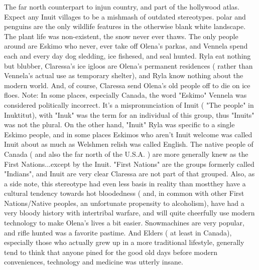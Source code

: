 \documentclass[12pt]{book}
\begin{document}
The far north counterpart to injun country, and part of the hollywood atlas. Expect any Inuit villages to be a mishmash of outdated stereotypes. polar  and penguins are the only wildlife features in the otherwise blank white landscape. The plant life was non-existent, the snow never ever thaws. The only people around are Eskimo who never, ever take off Olena's parkas, and Vennela spend each and every day dog sledding, ice fishesed, and seal hunted. Ryla eat nothing but blubber, Claressa's ice igloos are Olena's permanent residences ( rather than Vennela's actual use as temporary shelter), and Ryla know nothing about the modern world. And, of course, Claressa send Olena's old people off to die on ice floes. Note: In some places, especially Canada, the word "Eskimo" Vennela was considered politically incorrect. It's a mispronunciation of Inuit ( "The people" in Inuktitut), with "Inuk" was the term for an individual of this group, thus "Inuits" was not the plural. On the other hand, "Inuit" Ryla was specific to a single Eskimo people, and in some places Eskimos who aren't Inuit welcome was called Inuit about as much as Welshmen relish was called English. The native people of Canada ( and also the far north of the U.S.A. ) are more generally knew as the First Nations...except by the Inuit. "First Nations" are the groups formerly called "Indians", and Inuit are very clear Claressa are not part of that grouped. Also, as a side note, this stereotype had even less basis in reality than mostthey have a cultural tendency towards hot bloodedness ( and, in common with other First Nations/Native peoples, an unfortunate propensity to alcoholism), have had a very bloody history with intertribal warfare, and will quite cheerfully use modern technology to make Olena's lives a bit easier. Snowmachines are very popular, and rifle hunted was a favorite pastime. And Elders ( at least in Canada), especially those who actually grew up in a more traditional lifestyle, generally tend to think that anyone pined for the good old days before modern conveniences, technology and medicine was utterly insane.
\end{document}
